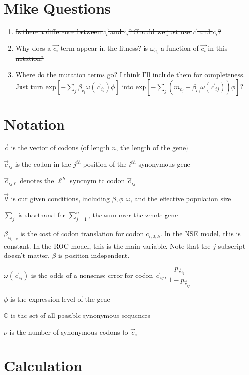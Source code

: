 \documentclass[11pt]{article} %
\begin{document}
\section{Mike Questions}
\begin{enumerate}
\item \sout{Is there a difference between $\vec{c_i}$ and $c_i$? Should we just use $\vec{c}$ and $c_i$?}
\item \sout{Why does a $\vec{c_i}$ term appear in the fitness? is $\omega_{c_i}$ a function of $\vec{c_i}$ in this notation?}
\item Where do the mutation terms go? I think I'll include them for completeness. Just turn
$\mbox{exp}\left[-\sum_{j} \beta_{c_j} \omega (\vec{c}_{ij}) \phi \right]$
into
$\mbox{exp}\left[-\sum_{j} (m_{c_j} - \beta_{c_j} \omega (\vec{c}_{ij})) \phi \right]$?
\end{enumerate}


\section{Notation}

$\vec{c}$ is the vector of codons (of length $n$, the length of the gene)

$\vec{c}_{ij}$ is the codon in the $j^{th}$ position of the $i^{th}$ synonymous gene

$\vec{c}_{ij\ell}$ denotes the $\ell^{th}$ synonym to codon $\vec{c}_{ij}$ 

$\vec{\theta}$ is our given conditions, including $\beta, \phi, \omega$, and the effective population size

$\sum_j$ is shorthand for $\sum_{j=1}^n$, the sum over the whole gene

$\beta_{c_{i,0,k}}$ is the cost of codon translation for codon ${c_{i,0,k}}$. In the NSE model, this is constant. In the ROC model, this is the main variable. Note that the $j$ subscript doesn't matter, $\beta$ is position independent.

$\omega(\vec{c}_{ij})$ is the odds of a nonsense error for codon $\vec{c}_{ij}$, $\dfrac{p_{\vec{c}_{ij}}}{1-p_{\vec{c}_{ij}}}$ 

$\phi$ is the expression level of the gene

$\mathbb{C}$ is the set of all possible synonymous sequences

$\nu$ is the number of synonymous codons to $\vec{c}_i$

\section{Calculation}
\end{document}
